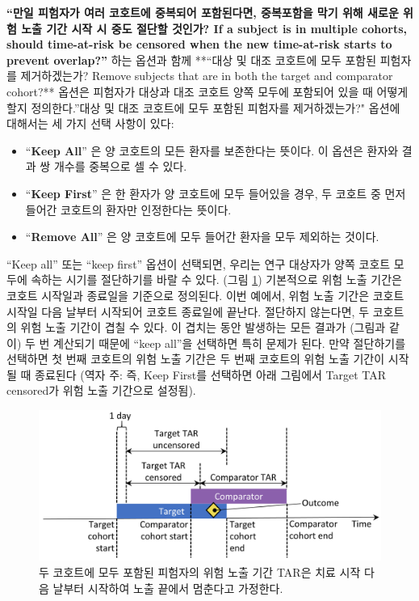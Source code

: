 \documentclass[10.5pt]{book}
\providecommand{\tightlist}{%
  \setlength{\itemsep}{0pt}\setlength{\parskip}{0pt}}
\theoremstyle{definition}
\theoremstyle{definition}
\theoremstyle{definition}
\theoremstyle{remark}
\begin{document}
\textbf{``만일 피험자가 여러 코호트에 중복되어 포함된다면, 중복포함을
막기 위해 새로운 위험 노출 기간 시작 시 중도 절단할 것인가? If a subject
is in multiple cohorts, should time-at-risk be censored when the new
time-at-risk starts to prevent overlap?''} 하는 옵션과 함께 **``대상 및
대조 코호트에 모두 포함된 피험자를 제거하겠는가? Remove subjects that
are in both the target and comparator cohort?** 옵션은 피험자가 대상과
대조 코호트 양쪽 모두에 포함되어 있을 때 어떻게 할지 정의한다.''대상 및
대조 코호트에 모두 포함된 피험자를 제거하겠는가?" 옵션에 대해서는 세
가지 선택 사항이 있다:

\begin{itemize}
\tightlist
\item
  ``\textbf{Keep All}'' 은 양 코호트의 모든 환자를 보존한다는 뜻이다. 이
  옵션은 환자와 결과 쌍 개수를 중복으로 셀 수 있다.
\item
  ``\textbf{Keep First}'' 은 한 환자가 양 코호트에 모두 들어있을 경우,
  두 코호트 중 먼저 들어간 코호트의 환자만 인정한다는 뜻이다.
\item
  ``\textbf{Remove All}'' 은 양 코호트에 모두 들어간 환자을 모두
  제외하는 것이다.
\end{itemize}

``Keep all'' 또는 ``keep first'' 옵션이 선택되면, 우리는 연구 대상자가
양쪽 코호트 모두에 속하는 시기를 절단하기를 바랄 수 있다. (그림
\ref{fig:tar}) 기본적으로 위험 노출 기간은 코호트 시작일과 종료일을
기준으로 정의된다. 이번 예에서, 위험 노출 기간은 코호트 시작일 다음
날부터 시작되어 코호트 종료일에 끝난다. 절단하지 않는다면, 두 코호트의
위험 노출 기간이 겹칠 수 있다. 이 겹치는 동안 발생하는 모든 결과가
(그림과 같이) 두 번 계산되기 때문에 ``keep all''을 선택하면 특히 문제가
된다. 만약 절단하기를 선택하면 첫 번째 코호트의 위험 노출 기간은 두 번째
코호트의 위험 노출 기간이 시작될 때 종료된다 (역자 주: 즉, Keep First를
선택하면 아래 그림에서 Target TAR censored가 위험 노출 기간으로 설정됨).

\begin{figure}

{\centering \includegraphics[width=0.9\linewidth]{images/PopulationLevelEstimation/tar} 

}

\caption{두 코호트에 모두 포함된 피험자의 위험 노출 기간 TAR은 치료 시작 다음 날부터 시작하여 노출 끝에서 멈춘다고 가정한다.}\label{fig:tar}
\end{figure}
\end{document}
